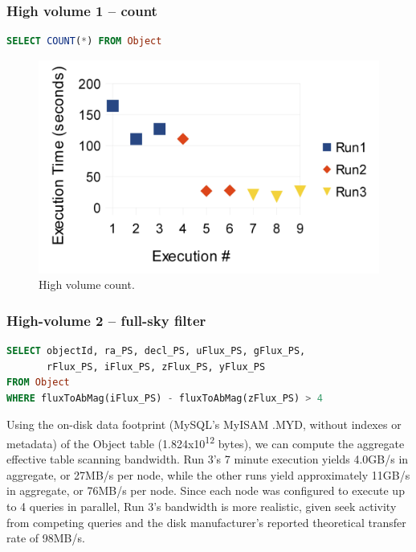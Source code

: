 \documentclass[DM,toc]{lsstdoc}
\begin{document}
\subsubsection{High volume 1 -- count}\label{high-volume-1-count}

\begin{lstlisting}[language=SQL]
SELECT COUNT(*) FROM Object
\end{lstlisting}

\begin{figure}[H]
\centering
\includegraphics{_static/150_node_high_volume_count}
\caption{High volume count.}
\end{figure}

\subsubsection{High-volume 2 -- full-sky
filter}\label{high-volume-2-full-sky-filter}

\begin{lstlisting}[language=SQL]
SELECT objectId, ra_PS, decl_PS, uFlux_PS, gFlux_PS,
       rFlux_PS, iFlux_PS, zFlux_PS, yFlux_PS
FROM Object
WHERE fluxToAbMag(iFlux_PS) - fluxToAbMag(zFlux_PS) > 4
\end{lstlisting}

Using the on-disk data footprint (MySQL's MyISAM .MYD, without indexes
or metadata) of the Object table (1.824x10\textsuperscript{12} bytes),
we can compute the aggregate effective table scanning bandwidth. Run 3's
7 minute execution yields 4.0GB/s in aggregate, or 27MB/s per node,
while the other runs yield approximately 11GB/s in aggregate, or 76MB/s
per node. Since each node was configured to execute up to 4 queries in
parallel, Run 3's bandwidth is more realistic, given seek activity from
competing queries and the disk manufacturer's reported theoretical
transfer rate of 98MB/s.
\end{document}
